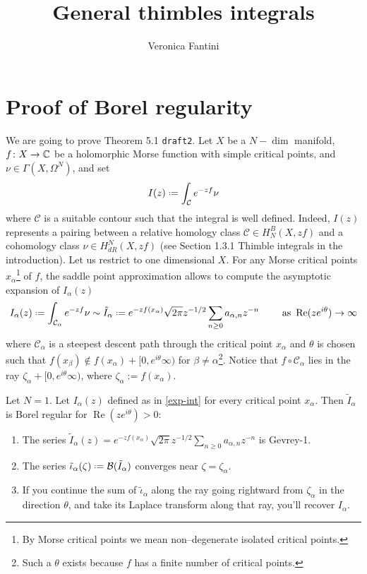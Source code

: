 \documentclass[11pt,a4paper,twoside,leqno,noamsfonts]{amsart}
\title[General thimbles integrals]{General thimbles integrals\\ [1ex]
  }
\author{
Veronica Fantini 
}
\numberwithin{equation}{section}
\begin{document}
\maketitle


\section{Proof of Borel regularity}

We are going to prove Theorem 5.1 {\tt draft2}. 
Let $X$ be a $N-\dim$ manifold, $f\colon X\to\mathbb C$ be a holomorphic Morse function with simple critical points, and $\nu\in\Gamma(X,\Omega^N)$, and set
\begin{equation}
I(z)\defeq\int_{\mathcal{C}}e^{-zf}\nu
\end{equation}
where $\mathcal{C}$ is a suitable contour such that the integral is well defined. Indeed, $I(z)$ represents a pairing between a relative homology class $\mathcal{C}\in H_{N}^{B}(X,zf)$ and a cohomology class $\nu\in H_{dR}^N(X,zf)$ (see Section 1.3.1 Thimble integrals in the introduction). 
Let us restrict to one dimensional $X$. For any Morse critical points $x_\alpha$\footnote{By Morse critical points we mean non--degenerate isolated critical points.} of $f$, the saddle point approximation allows to compute the asymptotic expansion of $I_\alpha(z)$ 
\begin{equation}\label{exp-int}
I_{\alpha}(z)\defeq\int_{\mathcal{C}_\alpha}e^{-zf}\nu\sim \tilde{I}_{\alpha}\defeq e^{-zf(x_\alpha)}\sqrt{2\pi} z^{-1/2}\sum_{n\geq 0}a_{\alpha,n}z^{-n} \qquad \text{ as } \operatorname{Re} (ze^{i\theta})\to\infty
\end{equation}
where $\mathcal{C}_\alpha$ is a steepest descent path through the critical point $x_\alpha$ and $\theta$ is chosen such that $f(x_\beta)\notin f(x_\alpha)+[0,e^{i\theta}\infty)$ for $\beta\neq\alpha$\footnote{Such a $\theta$ exists because $f$ has a finite number of critical points.}. Notice that $f \circ \mathcal{C}_\alpha$ lies in the ray $\zeta_\alpha +[0, e^{i\theta}\infty)$, where $\zeta_\alpha := f(x_\alpha)$.

\begin{theorem}\label{thm:maxim} Let $N=1$. Let ${I}_{\alpha}(z)$ defined as in \eqref{exp-int} for every critical point $x_\alpha$. Then $\tilde{I}_\alpha$ is Borel regular for $\operatorname{Re}(ze^{i\theta})>0$:
\begin{enumerate}
\item\label{int:series-gevrey} The series $\tilde{I}_\alpha(z)=e^{-zf(x_\alpha)}\sqrt{2\pi} z^{-1/2}\sum_{n\geq 0}a_{\alpha,n}z^{-n}$ is Gevrey-1.
\item\label{int:resum-converges} The series $\tilde{\iota}_\alpha(\zeta)\defeq\mathcal{B}(\tilde{I}_\alpha)$ converges near $\zeta=\zeta_{\alpha}$.
\item\label{int:resum-valid} If you continue the sum of $\tilde{\iota}_\alpha$ along the ray going rightward from $\zeta_\alpha$ in the direction $\theta$, and take its Laplace transform along that ray, you'll recover $I_\alpha$.
\end{enumerate}
\end{theorem}
\end{document}
